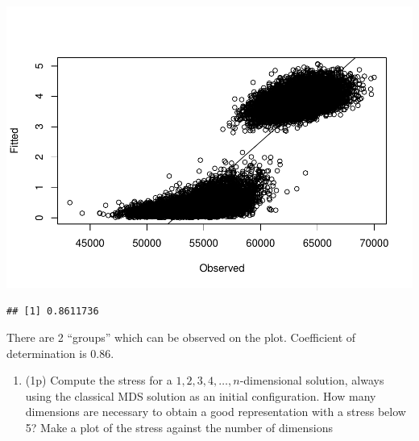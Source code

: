 \documentclass[
]{article}
\newenvironment{Shaded}{\begin{snugshade}}{\end{snugshade}}
\newcommand{\CommentTok}[1]{\textcolor[rgb]{0.56,0.35,0.01}{\textit{#1}}}
\newcommand{\DataTypeTok}[1]{\textcolor[rgb]{0.13,0.29,0.53}{#1}}
\newcommand{\DecValTok}[1]{\textcolor[rgb]{0.00,0.00,0.81}{#1}}
\newcommand{\KeywordTok}[1]{\textcolor[rgb]{0.13,0.29,0.53}{\textbf{#1}}}
\newcommand{\NormalTok}[1]{#1}
\newcommand{\OperatorTok}[1]{\textcolor[rgb]{0.81,0.36,0.00}{\textbf{#1}}}
\newcommand{\StringTok}[1]{\textcolor[rgb]{0.31,0.60,0.02}{#1}}
\providecommand{\tightlist}{%
  \setlength{\itemsep}{0pt}\setlength{\parskip}{0pt}}
\begin{document}
\includegraphics{P052020_Substructure_files/figure-latex/11th-1.pdf}

\begin{Shaded}
\end{Shaded}

\begin{verbatim}
## [1] 0.8611736
\end{verbatim}

There are 2 ``groups'' which can be observed on the plot. Coefficient of
determination is 0.86.

\begin{enumerate}
\def\labelenumi{\arabic{enumi}.}
\setcounter{enumi}{11}
\tightlist
\item
  (1p) Compute the stress for a \(1, 2, 3, 4, \ldots, n\)-dimensional
  solution, always using the classical MDS solution as an initial
  configuration. How many dimensions are necessary to obtain a good
  representation with a stress below 5? Make a plot of the stress
  against the number of dimensions
\end{enumerate}

\begin{Shaded}
\end{Shaded}
\end{document}
